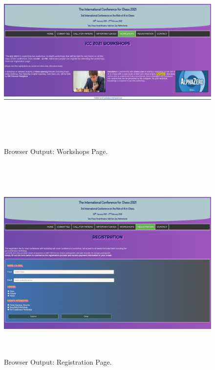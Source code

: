 \documentclass[12pt, a4]{article}
\begin{document}
\newpage
\subsection*{}
\begin{figure}[h]
\centering
\caption{Browser Output: Workshops Page.}
\includegraphics[height=10cm, width=18cm, keepaspectratio]{Output/Workshops.png}
\end{figure}

\newpage
\subsection*{}
\begin{figure}[h]
\centering
\caption{Browser Output: Registration Page.}
\includegraphics[height=10cm, width=18cm, keepaspectratio]{Output/Reg.png}
\end{figure}
\end{document}
